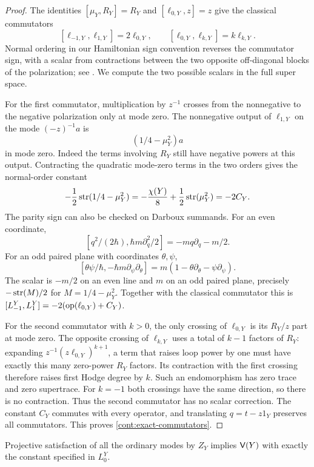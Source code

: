 \begin{proof}
The identities $[\mu_Y,R_Y]=R_Y$ and
$[\ell_{0,Y},z]=z$ give the classical commutators
\[
 [\ell_{-1,Y},\ell_{1,Y}]=2\ell_{0,Y},
 \qquad [\ell_{0,Y},\ell_{k,Y}]=k\ell_{k,Y}.
\]
Normal ordering in our Hamiltonian sign convention reverses
the commutator sign, with a scalar from contractions between
the two opposite off-diagonal blocks of the polarization;
see \cite[Section~2]{GiventalQuant}. We compute the two
possible scalars in the full super space.

For the first commutator, multiplication by $z^{-1}$
crosses from the nonnegative to the negative polarization
only at mode zero. The nonnegative output of
$\ell_{1,Y}$ on the mode $(-z)^{-1}a$ is
\[
                    (1/4-\mu_Y^2)a
\]
in mode zero. Indeed the terms involving $R_Y$ still have
negative powers at this output. Contracting the quadratic
mode-zero terms in the two orders gives the normal-order
constant
\[
 -\frac12\operatorname{str}(1/4-\mu_Y^2)
  =-\frac{\chi(Y)}8+\frac12\operatorname{str}(\mu_Y^2)
  =-2C_Y .
\]
The parity sign can also be checked on Darboux summands.
For an even coordinate,
\[
 [q^2/(2\hbar),\hbar m\partial_q^2/2]
                =-mq\partial_q-m/2.
\]
For an odd paired plane with coordinates $\theta,\psi$,
\[
 [\theta\psi/\hbar,-\hbar m\partial_\psi\partial_\theta]
          =m(1-\theta\partial_\theta-\psi\partial_\psi).
\]
The scalar is $-m/2$ on an even line and $m$
on an odd paired plane, precisely $-\operatorname{str}(M)/2$ for
$M=1/4-\mu_Y^2$.
Together with the classical commutator this is
$[L_{-1}^Y,L_1^Y]=-2(\operatorname{op}(\ell_{0,Y})+C_Y)$.

For the second commutator with $k>0$, the only crossing of
$\ell_{0,Y}$ is its $R_Y/z$ part at mode zero. The
opposite crossing of $\ell_{k,Y}$ uses a total of $k-1$
factors of $R_Y$: expanding
$z^{-1}(z\ell_{0,Y})^{k+1}$, a term that raises loop
power by one must have exactly this many zero-power
$R_Y$ factors. Its contraction with the first crossing
therefore raises first Hodge degree by $k$. Such an
endomorphism has zero trace and zero supertrace.
For $k=-1$ both crossings have the same direction, so
there is no contraction. Thus the second commutator has
no scalar correction. The constant $C_Y$ commutes with
every operator, and translating $q=t-z1_Y$ preserves
all commutators. This proves
\eqref{cont:exact-commutators}.
\end{proof}

\begin{corollary}
\label{cont:exact}
Projective satisfaction of all the ordinary modes by $Z_Y$
implies $\mathsf V(Y)$ with exactly the constant specified in
$L_0^Y$.
\end{corollary}

